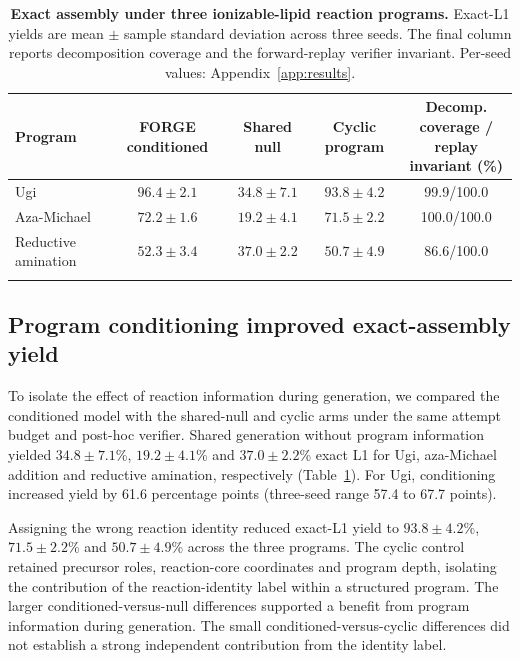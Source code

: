 \documentclass{article}
\theoremstyle{definition}
\newcommand{\ForgeTableOneCyclicBLYield}{$71.5\pm2.2$}
\newcommand{\ForgeTableOneCyclicLXYield}{$50.7\pm4.9$}
\newcommand{\ForgeTableOneCyclicUgiYield}{$93.8\pm4.2$}
\newcommand{\ForgeTableOneNullBLYield}{$19.2\pm4.1$}
\newcommand{\ForgeTableOneNullLXYield}{$37.0\pm2.2$}
\newcommand{\ForgeTableOneNullUgiDifferencePP}{61.6}
\newcommand{\ForgeTableOneNullUgiRangeHighPP}{67.7}
\newcommand{\ForgeTableOneNullUgiRangeLowPP}{57.4}
\newcommand{\ForgeTableOneNullUgiYield}{$34.8\pm7.1$}
\begin{document}
\begin{table}[H]
\caption{\textbf{Exact assembly under three ionizable-lipid reaction programs.}
Exact-L1 yields are mean $\pm$ sample standard deviation across three seeds. The final column reports
decomposition coverage and the forward-replay verifier invariant. Per-seed values:
Appendix~\ref{app:results}.}
\label{tab:iclr-shared-programs}
\centering
\small
\setlength{\tabcolsep}{4.6pt}
\begin{tabular}{@{}lcccc@{}}
\toprule
Program & FORGE conditioned & Shared null & Cyclic program &
\shortstack{Decomp. coverage /\\ replay invariant (\%)} \\
\midrule
Ugi & $96.4\pm2.1$ & $34.8\pm7.1$ & $93.8\pm4.2$ & 99.9/100.0 \\
Aza-Michael & $72.2\pm1.6$ & $19.2\pm4.1$ & $71.5\pm2.2$ & 100.0/100.0 \\
Reductive amination & $52.3\pm3.4$ & $37.0\pm2.2$ & $50.7\pm4.9$ & 86.6/100.0 \\
\relax{}\end{tabular}
\end{table}

\subsection{Program conditioning improved exact-assembly yield}
To isolate the effect of reaction information during generation, we compared the conditioned
model with the shared-null and cyclic arms under the same attempt budget and post-hoc verifier.
Shared generation without program information yielded \ForgeTableOneNullUgiYield\%,
\ForgeTableOneNullBLYield\% and \ForgeTableOneNullLXYield\% exact L1 for Ugi, aza-Michael addition
and reductive amination, respectively (Table~\ref{tab:iclr-shared-programs}). For Ugi, conditioning
increased yield by \ForgeTableOneNullUgiDifferencePP{} percentage points (three-seed range
\ForgeTableOneNullUgiRangeLowPP{} to \ForgeTableOneNullUgiRangeHighPP{} points).

Assigning the wrong reaction identity reduced exact-L1 yield to
\ForgeTableOneCyclicUgiYield\%, \ForgeTableOneCyclicBLYield\% and
\ForgeTableOneCyclicLXYield\% across the three programs. The cyclic control retained precursor roles, reaction-core
coordinates and program depth, isolating the contribution of the reaction-identity label within a
structured program. The larger conditioned-versus-null differences supported a benefit from program
information during generation. The small conditioned-versus-cyclic differences did not establish
a strong independent contribution from the identity label.
\end{document}
